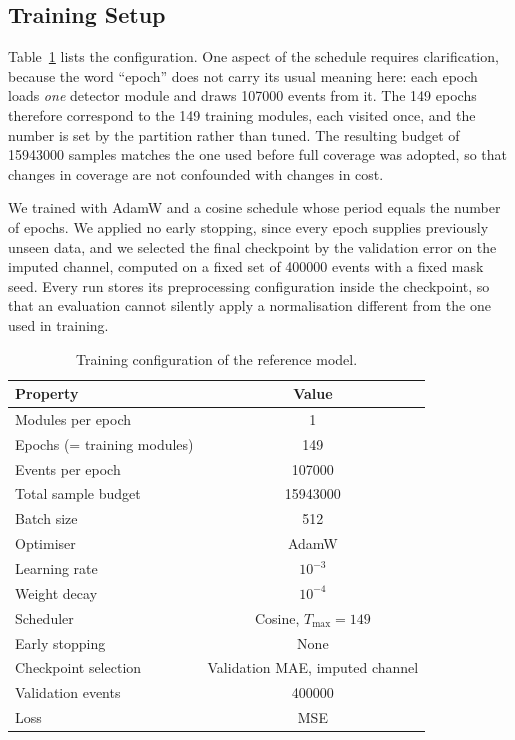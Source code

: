 \documentclass[10pt,conference]{IEEEtran}
\begin{document}
\subsection{Training Setup}
\label{sec:training}

Table~\ref{tab:hyperparams} lists the configuration. One aspect of the schedule
requires clarification, because the word ``epoch'' does not carry its usual
meaning here: each epoch loads \emph{one} detector module and draws
\num{107000} events from it. The 149 epochs therefore correspond to the 149
training modules, each visited once, and the number is set by the partition
rather than tuned. The resulting budget of \num{15943000} samples matches the
one used before full coverage was adopted, so that changes in coverage are not
confounded with changes in cost.

We trained with AdamW and a cosine schedule whose period equals the number of
epochs. We applied no early stopping, since every epoch supplies previously
unseen data, and we selected the final checkpoint by the validation error on
the imputed channel, computed on a fixed set of \num{400000} events with a
fixed mask seed. Every run stores its preprocessing configuration inside the
checkpoint, so that an evaluation cannot silently apply a normalisation
different from the one used in training.

\begin{table}[t]
\centering
\caption{Training configuration of the reference model.}
\label{tab:hyperparams}
\begin{tabular}{@{}lc@{}}
\toprule
\textbf{Property} & \textbf{Value} \\
\midrule
Modules per epoch          & 1 \\
Epochs (= training modules) & 149 \\
Events per epoch           & \num{107000} \\
Total sample budget        & \num{15943000} \\
Batch size                 & 512 \\
Optimiser                  & AdamW \\
Learning rate              & $10^{-3}$ \\
Weight decay               & $10^{-4}$ \\
Scheduler                  & Cosine, $T_{\max} = 149$ \\
Early stopping             & None \\
Checkpoint selection       & Validation MAE, imputed channel \\
Validation events          & \num{400000} \\
Loss                       & MSE \\
\bottomrule
\end{tabular}
\end{table}
\end{document}
